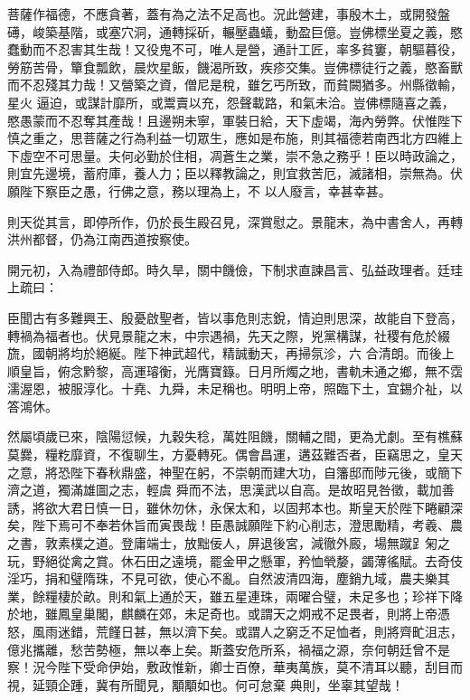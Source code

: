 \begin{pinyinscope}
 菩薩作福德，不應貪著，蓋有為之法不足高也。況此營建，事殷木土，或開發盤礡，峻築基階，或塞穴洞，通轉採斫，輾壓蟲蟻，動盈巨億。豈佛標坐夏之義，愍蠢動而不忍害其生哉！又役鬼不可，唯人是營，通計工匠，率多貧窶，朝驅暮役，勞筋苦骨，簞食瓢飲，晨炊星飯，饑渴所致，疾疹交集。豈佛標徒行之義，愍畜獸而不忍殘其力哉！又營築之資，僧尼是稅，雖乞丐所致，而貧闕猶多。州縣徵輸，星火
 逼迫，或謀計靡所，或鬻賣以充，怨聲載路，和氣未洽。豈佛標隨喜之義，愍愚蒙而不忍奪其產哉！且邊朔未寧，軍裝日給，天下虛竭，海內勞弊。伏惟陛下慎之重之，思菩薩之行為利益一切眾生，應如是布施，則其福德若南西北方四維上下虛空不可思量。夫何必勤於住相，凋蒼生之業，崇不急之務乎！臣以時政論之，則宜先邊境，蓄府庫，養人力；臣以釋教論之，則宜救苦厄，滅諸相，崇無為。伏願陛下察臣之愚，行佛之意，務以理為上，不
 以人廢言，幸甚幸甚。



 則天從其言，即停所作，仍於長生殿召見，深賞慰之。景龍末，為中書舍人，再轉洪州都督，仍為江南西道按察使。



 開元初，入為禮部侍郎。時久旱，關中饑儉，下制求直諫昌言、弘益政理者。廷珪上疏曰：



 臣聞古有多難興王、殷憂啟聖者，皆以事危則志銳，情迫則思深，故能自下登高，轉禍為福者也。伏見景龍之末，中宗遇禍，先天之際，兇黨構謀，社稷有危於綴旒，國朝將均於絕綖。陛下神武超代，精誠動天，再掃氛沴，六
 合清朗。而後上順皇旨，俯念黔黎，高運璿衡，光膺寶籙。日月所燭之地，書軌未通之鄉，無不霑濡渥恩，被服淳化。十堯、九舜，未足稱也。明明上帝，照臨下土，宜錫介祉，以答鴻休。



 然屬頃歲已來，陰陽愆候，九穀失稔，萬姓阻饑，關輔之間，更為尤劇。至有樵蘇莫爨，糧籺靡資，不復聊生，方憂轉死。偶會昌運，遘茲難否者，臣竊思之，皇天之意，將恐陛下春秋鼎盛，神聖在躬，不崇朝而建大功，自籓邸而陟元後，或簡下濟之道，獨滿雄圖之志，輕虞
 舜而不法，思漢武以自高。是故昭見咎徵，載加善誘，將欲大君日慎一日，雖休勿休，永保太和，以固邦本也。斯皇天於陛下睠顧深矣，陛下焉可不奉若休旨而寅畏哉！臣愚誠願陛下約心削志，澄思勵精，考羲、農之書，敦素樸之道。登庸端士，放黜佞人，屏退後宮，減徹外廄，場無蹴𧾷匊之玩，野絕從禽之賞。休石田之遠境，罷金甲之懸軍，矜恤煢嫠，蠲薄徭賦。去奇伎淫巧，捐和璧隋珠，不見可欲，使心不亂。自然波清四海，塵銷九域，農夫樂其
 業，餘糧棲於畝。則和氣上通於天，雖五星連珠，兩曜合璧，未足多也；珍祥下降於地，雖鳳皇巢閣，麒麟在郊，未足奇也。或謂天之炯戒不足畏者，則將上帝憑怒，風雨迷錯，荒饉日甚，無以濟下矣。或謂人之窮乏不足恤者，則將齊甿沮志，億兆攜離，愁苦勢極，無以奉上矣。斯蓋安危所系，禍福之源，奈何朝廷曾不是察！況今陛下受命伊始，敷政惟新，卿士百僚，華夷萬族，莫不清耳以聽，刮目而視，延頸企踵，冀有所聞見，顒顒如也。何可怠棄
 典則，坐辜其望哉！




\end{pinyinscope}
